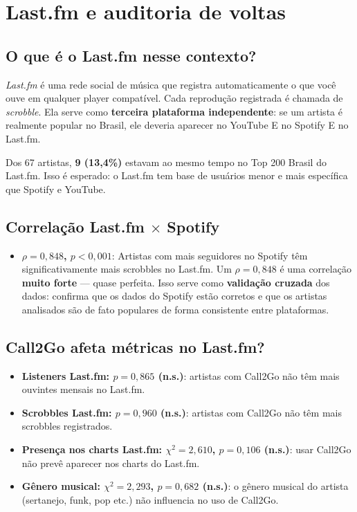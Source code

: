 \documentclass[12pt,a4paper]{article}
\newcommand{\num}[1]{\textcolor{azul}{\textbf{#1}}}
\newcommand{\term}[1]{\textcolor{roxo}{\textit{#1}}}
\begin{document}
\section{Last.fm e auditoria de voltas}

\subsection{O que é o Last.fm nesse contexto?}

\term{Last.fm} é uma rede social de música que registra automaticamente o que
você ouve em qualquer player compatível. Cada reprodução registrada é chamada
de \term{scrobble}. Ela serve como \textbf{terceira plataforma independente}:
se um artista é realmente popular no Brasil, ele deveria aparecer no YouTube E
no Spotify E no Last.fm.

Dos 67 artistas, \num{9 (13,4\%)} estavam ao mesmo tempo no Top 200 Brasil do
Last.fm. Isso é esperado: o Last.fm tem base de usuários menor e mais
específica que Spotify e YouTube.

\subsection{Correlação Last.fm $\times$ Spotify}

\begin{itemize}
  \item \textbf{$\rho = 0{,}848$, $p < 0{,}001$}: Artistas com mais
        seguidores no Spotify têm significativamente mais scrobbles no Last.fm.
        Um $\rho = 0{,}848$ é uma correlação \textbf{muito forte} --- quase
        perfeita. Isso serve como \textbf{validação cruzada} dos dados:
        confirma que os dados do Spotify estão corretos e que os artistas
        analisados são de fato populares de forma consistente entre plataformas.
\end{itemize}

\subsection{Call2Go afeta métricas no Last.fm?}

\begin{itemize}
  \item \textbf{Listeners Last.fm: $p = 0{,}865$ (n.s.)}: artistas com Call2Go
        não têm mais ouvintes mensais no Last.fm.
  \item \textbf{Scrobbles Last.fm: $p = 0{,}960$ (n.s.)}: artistas com Call2Go
        não têm mais scrobbles registrados.
  \item \textbf{Presença nos charts Last.fm: $\chi^2 = 2{,}610$,
        $p = 0{,}106$ (n.s.)}: usar Call2Go não prevê aparecer nos charts do
        Last.fm.
  \item \textbf{Gênero musical: $\chi^2 = 2{,}293$, $p = 0{,}682$ (n.s.)}:
        o gênero musical do artista (sertanejo, funk, pop etc.) não influencia
        no uso de Call2Go.
\end{itemize}
\end{document}
